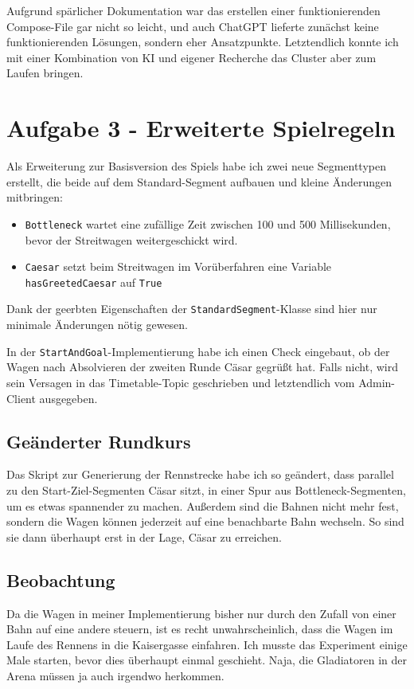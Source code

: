 \documentclass[12pt]{article}
\begin{document}
Aufgrund spärlicher Dokumentation war das erstellen einer funktionierenden Compose-File gar nicht so leicht, und auch ChatGPT lieferte zunächst keine funktionierenden Lösungen, sondern eher Ansatzpunkte.
Letztendlich konnte ich mit einer Kombination von KI und eigener Recherche das Cluster aber zum Laufen bringen.

\section*{Aufgabe 3 - Erweiterte Spielregeln}
Als Erweiterung zur Basisversion des Spiels habe ich zwei neue Segmenttypen erstellt, die beide auf dem Standard-Segment aufbauen und kleine Änderungen mitbringen:
\begin{itemize}
	\item \texttt{Bottleneck} wartet eine zufällige Zeit zwischen 100 und 500 Millisekunden, bevor der Streitwagen weitergeschickt wird.
	\item \texttt{Caesar} setzt beim Streitwagen im Vorüberfahren eine Variable \texttt{hasGreetedCaesar} auf \texttt{True}
\end{itemize}

Dank der geerbten Eigenschaften der \texttt{StandardSegment}-Klasse sind hier nur minimale Änderungen nötig gewesen.

In der \texttt{StartAndGoal}-Implementierung habe ich einen Check eingebaut, ob der Wagen nach Absolvieren der zweiten Runde Cäsar gegrüßt hat. Falls nicht, wird sein Versagen in das Timetable-Topic geschrieben und letztendlich vom Admin-Client ausgegeben.

\subsection*{Geänderter Rundkurs}
Das Skript zur Generierung der Rennstrecke habe ich so geändert, dass parallel zu den Start-Ziel-Segmenten Cäsar sitzt, in einer Spur aus Bottleneck-Segmenten, um es etwas spannender zu machen.
Außerdem sind die Bahnen nicht mehr fest, sondern die Wagen können jederzeit auf eine benachbarte Bahn wechseln.
So sind sie dann überhaupt erst in der Lage, Cäsar zu erreichen.

\subsection*{Beobachtung}
Da die Wagen in meiner Implementierung bisher nur durch den Zufall von einer Bahn auf eine andere steuern, ist es recht unwahrscheinlich, dass die Wagen im Laufe des Rennens in die Kaisergasse einfahren.
Ich musste das Experiment einige Male starten, bevor dies überhaupt einmal geschieht.
Naja, die Gladiatoren in der Arena müssen ja auch irgendwo herkommen.
\end{document}
